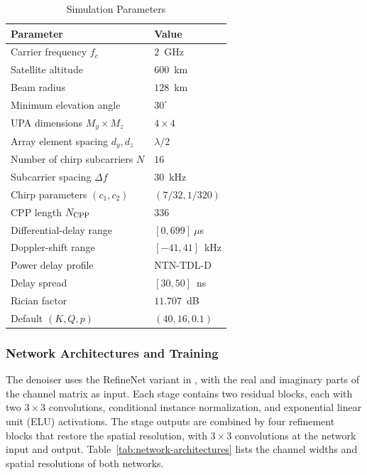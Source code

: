 \begin{table}[!t]
\caption{Simulation Parameters}
\label{tab:simulation-parameters}
\centering
\small
\begin{tabular}{@{}ll@{}}
\toprule
Parameter & Value \\
\midrule
Carrier frequency $f_c$ & $2$~GHz \\
Satellite altitude & $600$~km \\
Beam radius & $128$~km \\
Minimum elevation angle & $30^\circ$ \\
UPA dimensions $M_y\times M_z$ & $4\times4$ \\
Array element spacing $d_y,d_z$ & $\lambda/2$ \\
Number of chirp subcarriers $N$ & $16$ \\
Subcarrier spacing $\Delta f$ & $30$~kHz \\
Chirp parameters $(c_1,c_2)$ & $(7/32,1/320)$ \\
CPP length $N_{\rm CPP}$ & $336$ \\
Differential-delay range & $[0,699]~\mu$s \\
Doppler-shift range & $[-41,41]$~kHz \\
Power delay profile & NTN-TDL-D \\
Delay spread & $[30,50]$~ns \\
Rician factor & $11.707$~dB \\
Default $(K,Q,p)$ & $(40,16,0.1)$ \\
\bottomrule
\end{tabular}
\end{table}

\subsubsection{Network Architectures and Training}
\label{sec:network-settings}
\label{sec:training-settings}
The denoiser uses the RefineNet \cite{lin2017} variant in
\cite{song2019}, with the real and imaginary parts of the channel
matrix as input.
Each stage contains two residual blocks, each with two
$3\times3$ convolutions, conditional instance normalization, and
exponential linear unit (ELU) activations.
The stage outputs are combined by four refinement blocks that restore
the spatial resolution, with $3\times3$ convolutions at the network
input and output. Table~\ref{tab:network-architectures} lists the channel
widths and spatial resolutions of both networks.

